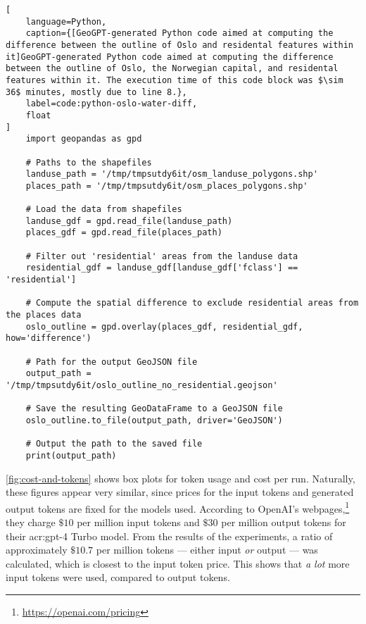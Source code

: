 \begin{lstlisting}[
    language=Python,
    caption={[GeoGPT-generated Python code aimed at computing the difference between the outline of Oslo and residental features within it]GeoGPT-generated Python code aimed at computing the difference between the outline of Oslo, the Norwegian capital, and residental features within it. The execution time of this code block was $\sim 36$ minutes, mostly due to line 8.},
    label=code:python-oslo-water-diff,
    float
]
    import geopandas as gpd

    # Paths to the shapefiles
    landuse_path = '/tmp/tmpsutdy6it/osm_landuse_polygons.shp'
    places_path = '/tmp/tmpsutdy6it/osm_places_polygons.shp'
    
    # Load the data from shapefiles
    landuse_gdf = gpd.read_file(landuse_path)
    places_gdf = gpd.read_file(places_path)
    
    # Filter out 'residential' areas from the landuse data
    residential_gdf = landuse_gdf[landuse_gdf['fclass'] == 'residential']
     
    # Compute the spatial difference to exclude residential areas from the places data
    oslo_outline = gpd.overlay(places_gdf, residential_gdf, how='difference')
    
    # Path for the output GeoJSON file
    output_path = '/tmp/tmpsutdy6it/oslo_outline_no_residential.geojson'
    
    # Save the resulting GeoDataFrame to a GeoJSON file
    oslo_outline.to_file(output_path, driver='GeoJSON')
    
    # Output the path to the saved file
    print(output_path)    
\end{lstlisting}

\autoref{fig:cost-and-tokens} shows box plots for token usage and cost per run. Naturally, these figures appear very similar, since prices for the input tokens and generated output tokens are fixed for the models used. According to OpenAI's webpages,\footnote{\url{https://openai.com/pricing}} they charge $\$10$ per million input tokens and $\$30$ per million output tokens for their \acrshort{acr:gpt}-4 Turbo model. From the results of the experiments, a ratio of approximately $\text{\$}10.7$ per million tokens --- either input \textit{or} output --- was calculated, which is closest to the input token price. This shows that \textit{a lot} more input tokens were used, compared to output tokens.

